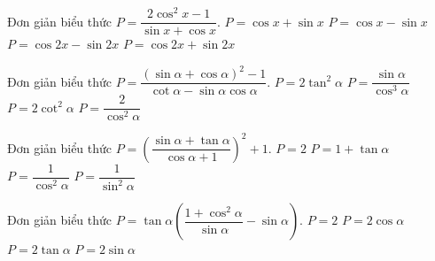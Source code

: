 \begin{ex}%
Đơn giản biểu thức $P=\dfrac{{2{\cos}^2x-1}}{{\sin x+\cos x}}.$
\choice
{$P=\cos x+\sin x$}
{\True $P=\cos x-\sin x$}
{$P=\cos 2x-\sin 2x$}
{$P=\cos 2x+\sin 2x$}
\end{ex}

\begin{ex}%
Đơn giản biểu thức $P=\dfrac{{{\left({\sin \alpha+\cos \alpha}\right)}^2-1}}{{\cot \alpha-\sin \alpha \cos\alpha}}.$
\choice
{\True $P=2\tan ^2\alpha$}
{$P=\dfrac{{\sin \alpha}}{{{\cos}^3\alpha}}$}
{$P=2\cot ^2\alpha$}
{$P=\dfrac{2}{{{\cos}^2\alpha}}$}
\end{ex}

\begin{ex}%
Đơn giản biểu thức $P=\left({\dfrac{{\sin \alpha+\tan \alpha}}{{\cos \alpha+1}}}\right)^2+1.$
\choice
{$P=2$}
{$P=1+\tan \alpha$}
{\True $P=\dfrac{1}{{{\cos}^2\alpha}}$}
{$P=\dfrac{1}{{{\sin}^2\alpha}}$}
\end{ex}

\begin{ex}%
Đơn giản biểu thức $P=\tan \alpha \left({\dfrac{{1+{\cos}^2\alpha}}{{\sin \alpha}}-\sin \alpha}\right).$
\choice
{$P=2$}
{\True $P=2\cos \alpha$}
{$P=2\tan \alpha$}
{$P=2\sin \alpha$}
\end{ex}


